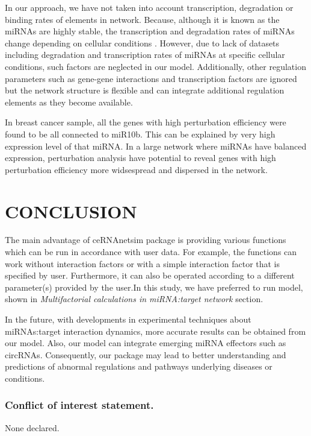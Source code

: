 \documentclass[a4,center,fleqn]{NAR}
\begin{document}
In our approach, we have not taken into account transcription,
degradation or binding rates of elements in network. Because, although
it is known as the miRNAs are highly stable, the transcription and
degradation rates of miRNAs change depending on cellular conditions
\citep{ruegger_microrna_2012}. However, due to lack of datasets
including degradation and transcription rates of miRNAs at specific
cellular conditions, such factors are neglected in our model.
Additionally, other regulation parameters such as gene-gene interactions
and transcription factors are ignored but the network structure is
flexible and can integrate additional regulation elements as they become
available.

In breast cancer sample, all the genes with high perturbation efficiency
were found to be all connected to miR10b. This can be explained by very
high expression level of that miRNA. In a large network where miRNAs
have balanced expression, perturbation analysis have potential to reveal
genes with high perturbation efficiency more widsespread and dispersed
in the network.

\section{\texorpdfstring{\textbf{CONCLUSION}}{}}

The main advantage of ceRNAnetsim package is providing various functions
which can be run in accordance with user data. For example, the
functions can work without interaction factors or with a simple
interaction factor that is specified by user. Furthermore, it can also
be operated according to a different parameter(s) provided by the
user.In this study, we have preferred to run model, shown in
\emph{Multifactorial calculations in miRNA:target network} section.

In the future, with developments in experimental techniques about
miRNAs:target interaction dynamics, more accurate results can be
obtained from our model. Also, our model can integrate emerging miRNA
effectors such as circRNAs. Consequently, our package may lead to better
understanding and predictions of abnormal regulations and pathways
underlying diseases or conditions.

\subsubsection{Conflict of interest statement.}

None declared.



\end{document}
